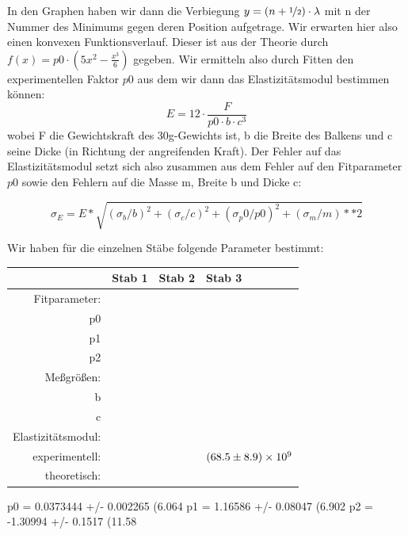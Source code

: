 In den Graphen haben wir dann die Verbiegung $y = (n + \nicefrac{1}{2}) \cdot \lambda$ mit n der Nummer des Minimums gegen deren Position aufgetrage. Wir erwarten hier also einen konvexen Funktionsverlauf. Dieser ist aus der Theorie durch 
$f(x) = p0 \cdot (5 x^2  - \frac{x^3}{6})$ gegeben. Wir ermitteln also durch Fitten den experimentellen Faktor $p0$ aus dem wir dann das Elastizitätsmodul bestimmen können: 
\[
 E = 12 \cdot \frac{F}{  p0 \cdot b \cdot c^3}
\]
wobei F die Gewichtskraft des 30g-Gewichts ist, b die Breite des Balkens und c seine Dicke (in Richtung der angreifenden Kraft). Der Fehler auf das Elastizitätsmodul setzt sich also zusammen aus dem Fehler auf den Fitparameter $p0$ sowie den Fehlern auf die Masse m, Breite b und Dicke c:

\[
  \sigma_E = E * \sqrt{(\sigma_b/b)^2 + (\sigma_c/c)^2 + (\sigma_p0/p0)^2 + (\sigma_m/m)**2}
\]

Wir haben für die einzelnen Stäbe folgende Parameter bestimmt:
\begin{tabular}{rlll}
 \toprule
 & Stab 1 & Stab 2 & Stab 3 \\
 \midrule
Fitparameter:\\
 p0 & & & \\
 p1 & & & \\
 p2 & & & \\
Meßgrößen:\\
b & & & \\
c & & & \\
Elastizitätsmodul:\\
experimentell: & & & $(68.5 \pm 8.9)\times 10^{9}$ \\
theoretisch: & & & \\
\end{tabular}
 p0              = 0.0373444        +/- 0.002265     (6.064%
p1              = 1.16586          +/- 0.08047      (6.902%
p2              = -1.30994         +/- 0.1517       (11.58%
% 
% 
% 
% 
% 
% 
% 
% 

